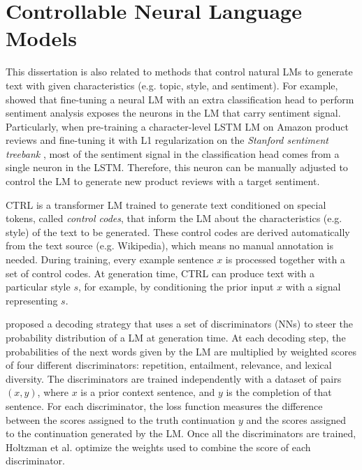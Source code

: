 
\section{Controllable Neural Language Models}
\label{sec:related_nlp}

This dissertation is also related to methods that control natural LMs to generate text with given characteristics (e.g. topic, style, and sentiment). For example, \citet{radford_2017} showed that fine-tuning a neural LM with an extra classification head to perform sentiment analysis exposes the neurons in the LM that carry sentiment signal. Particularly, when pre-training a character-level LSTM LM on Amazon product reviews \cite{He2016} and fine-tuning it with L1 regularization on the \textit{Stanford sentiment treebank} \cite{socher2013recursive}, most of the sentiment signal in the classification head comes from a single neuron in the LSTM. Therefore, this neuron can be manually adjusted to control the LM to generate new product reviews with a target sentiment.

CTRL \cite{keskar2019ctrl} is a transformer LM trained to generate text conditioned on special tokens, called \textit{control codes}, that inform the LM about the characteristics (e.g. style) of the text to be generated. These control codes are derived automatically from the text source (e.g. Wikipedia), which means no manual annotation is needed. During training, every example sentence $x$ is processed together with a set of control codes. At generation time, CTRL can produce text with a particular style $s$, for example, by conditioning the prior input $x$ with a signal representing $s$.


\citet{holtzman2018learning} proposed a decoding strategy that uses a set of discriminators (NNs) to steer the probability distribution of a LM at generation time. At each decoding step, the probabilities of the next words given by the LM are multiplied by weighted scores of four different discriminators: repetition, entailment, relevance, and lexical diversity. The discriminators are trained independently with a dataset of pairs $(x, y)$, where $x$ is a prior context sentence, and $y$ is the completion of that sentence. For each discriminator, the loss function measures the difference between the scores assigned to the truth continuation $y$ and the scores assigned to the continuation generated by the LM. Once all the discriminators are trained, Holtzman et al. \cite{holtzman2018learning} optimize the weights used to combine the score of each discriminator.

